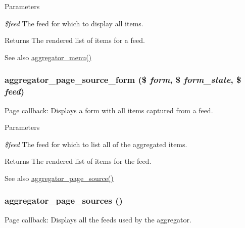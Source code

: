 \begin{DoxyParams}{Parameters}
\item[{\em \$feed}]The feed for which to display all items.\end{DoxyParams}
\begin{DoxyReturn}{Returns}
The rendered list of items for a feed.
\end{DoxyReturn}
\begin{DoxySeeAlso}{See also}
\hyperlink{aggregator_8module_a18d55253ab5538426a4fc6d20b672dda}{aggregator\_\-menu()} 
\end{DoxySeeAlso}
\hypertarget{aggregator_8pages_8inc_a8091bff5e7ba3719b50081afe2d51db4}{
\subsubsection[{aggregator\_\-page\_\-source\_\-form}]{\setlength{\rightskip}{0pt plus 5cm}aggregator\_\-page\_\-source\_\-form (\$ {\em form}, \/  \$ {\em form\_\-state}, \/  \$ {\em feed})}}
\label{aggregator_8pages_8inc_a8091bff5e7ba3719b50081afe2d51db4}
Page callback: Displays a form with all items captured from a feed.


\begin{DoxyParams}{Parameters}
\item[{\em \$feed}]The feed for which to list all of the aggregated items.\end{DoxyParams}
\begin{DoxyReturn}{Returns}
The rendered list of items for the feed.
\end{DoxyReturn}
\begin{DoxySeeAlso}{See also}
\hyperlink{aggregator_8pages_8inc_a86e3f4a4faec71de2d52a3c655b62757}{aggregator\_\-page\_\-source()} 
\end{DoxySeeAlso}
\hypertarget{aggregator_8pages_8inc_ad0ef3a50612adec65e464214ce643bf6}{
\subsubsection[{aggregator\_\-page\_\-sources}]{\setlength{\rightskip}{0pt plus 5cm}aggregator\_\-page\_\-sources ()}}
\label{aggregator_8pages_8inc_ad0ef3a50612adec65e464214ce643bf6}
Page callback: Displays all the feeds used by the aggregator.

